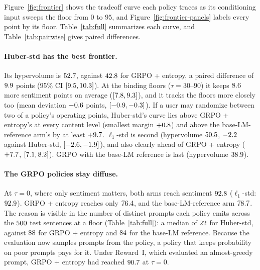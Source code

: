 Figure~\ref{fig:frontier} shows the tradeoff curve each policy traces as its
conditioning input sweeps the floor from $0$ to $95$, and
Figure~\ref{fig:frontier-panels} labels every point by its floor.
Table~\ref{tab:full} summarizes each curve, and Table~\ref{tab:pairwise} gives
paired differences.

\paragraph{\rrebel{} Huber-std has the best frontier.}
Its hypervolume is $52.7$, against $42.8$ for GRPO + entropy, a paired
difference of $9.9$ points
($95\%$ CI $[9.5, 10.3]$). At the binding floors
($\tau = 30$--$90$) it keeps $8.6$ more sentiment points on
average ($[7.8, 9.3]$), and it tracks the
floors more closely too (mean deviation $-0.6$ points,
$[-0.9, -0.3]$). If a user may randomize between two of a policy's
operating points, Huber-std's curve lies above GRPO + entropy's at every
content level (smallest margin $+0.8$) and above the base-LM-reference
arm's by at least $+9.7$. \rrebel{} $\ell_1$-std is second
(hypervolume $50.5$, $-2.2$ against Huber-std,
$[-2.6, -1.9]$), and also clearly ahead of
GRPO + entropy ($+7.7$, $[7.1, 8.2]$).
GRPO with the base-LM reference is last (hypervolume $38.9$).

\paragraph{The GRPO policies stay diffuse.}
At $\tau = 0$, where only sentiment matters, both \rrebel{} arms reach
sentiment $92.8$ ($\ell_1$-std: $92.9$). GRPO + entropy reaches
only $76.4$, and the base-LM-reference arm $78.7$. The
reason is visible in the number of distinct prompts each policy emits across
the $500$ test sentences at a floor (Table~\ref{tab:full}): a median of
$22$ for Huber-std, against $88$ for GRPO + entropy and
$84$ for the base-LM reference. Because the evaluation now samples
prompts from the policy, a policy that keeps probability on poor prompts pays
for it. Under Reward~I, which evaluated an almost-greedy prompt, GRPO + entropy
had reached $90.7$ at $\tau = 0$.


